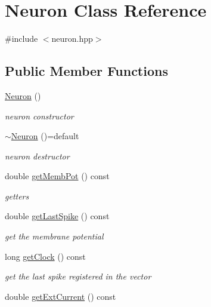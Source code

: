 \hypertarget{classNeuron}{\section{Neuron Class Reference}
\label{classNeuron}
}


{\ttfamily \#include $<$neuron.\-hpp$>$}

\subsection*{Public Member Functions}
\begin{DoxyCompactItemize}
\item 
\hyperlink{classNeuron_a823487d01615fadb8ac19a2768dd9d96}{Neuron} ()
\begin{DoxyCompactList}\small\item\em neuron constructor \end{DoxyCompactList}\item 
\hyperlink{classNeuron_a7350045966914cd4bcddac6706e7d864}{$\sim$\-Neuron} ()=default
\begin{DoxyCompactList}\small\item\em neuron destructor \end{DoxyCompactList}\item 
\hypertarget{classNeuron_a2d5813a910d37557ab9ff24d04d75a4f}{double \hyperlink{classNeuron_a2d5813a910d37557ab9ff24d04d75a4f}{get\-Memb\-Pot} () const }\label{classNeuron_a2d5813a910d37557ab9ff24d04d75a4f}

\begin{DoxyCompactList}\small\item\em getters \end{DoxyCompactList}\item 
double \hyperlink{classNeuron_a93930fdb39219c4b79d3badf76ae00f7}{get\-Last\-Spike} () const 
\begin{DoxyCompactList}\small\item\em get the membrane potential \end{DoxyCompactList}\item 
\hypertarget{classNeuron_a0998d7e67725ffc3005d42d95fb45962}{long \hyperlink{classNeuron_a0998d7e67725ffc3005d42d95fb45962}{get\-Clock} () const }\label{classNeuron_a0998d7e67725ffc3005d42d95fb45962}

\begin{DoxyCompactList}\small\item\em get the last spike registered in the vector \end{DoxyCompactList}\item 
\hypertarget{classNeuron_acde6fef203152a9e3887f322ffdaa9dd}{double \hyperlink{classNeuron_acde6fef203152a9e3887f322ffdaa9dd}{get\-Ext\-Current} () const }\label{classNeuron_acde6fef203152a9e3887f322ffdaa9dd}


\end{DoxyCompactItemize}
